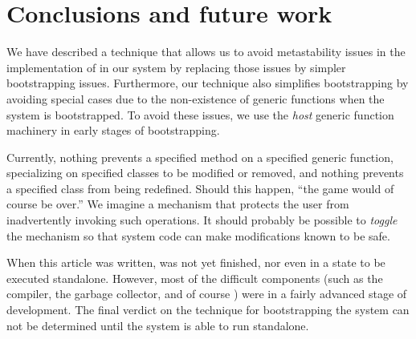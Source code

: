 \section{Conclusions and future work}

We have described a technique that allows us to avoid metastability
issues in the implementation of \clos{} in our system \sicl{} by
replacing those issues by simpler bootstrapping issues.  Furthermore,
our technique also simplifies bootstrapping by avoiding special cases
due to the non-existence of generic functions when the system is
bootstrapped. To avoid these issues, we use the \emph{host} generic
function machinery in early stages of bootstrapping.

Currently, nothing prevents a specified method on a specified generic
function, specializing on specified classes to be modified or removed,
and nothing prevents a specified class from being redefined.  Should
this happen, ``the game would of course be over.''  We imagine a
mechanism that protects the user from inadvertently invoking such
operations.  It should probably be possible to \emph{toggle} the
mechanism so that system code can make modifications known to be safe.

When this article was written, \sicl{} was not yet finished, nor even in
a state to be executed standalone.  However, most of the difficult
components (such as the compiler, the garbage collector, and of course
\clos{}) were in a fairly advanced stage of development.  The final
verdict on the technique for bootstrapping the system can not be
determined until the system is able to run standalone.

